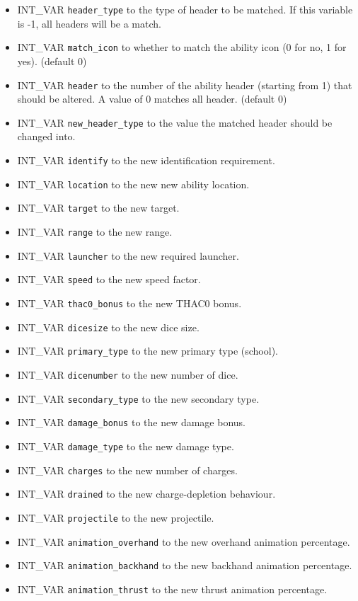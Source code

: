 \documentclass{article}
\begin{document}
\begin{itemize}
\item INT_VAR \verb+header_type+ to the type of header to be matched. If this variable is -1, all headers will be a match.
\item INT_VAR \verb+match_icon+ to whether to match the ability icon (0 for no, 1 for yes). (default 0)
\item INT_VAR \verb+header+ to the number of the ability header (starting from 1) that should be altered. A value of 0 matches all header. (default 0)
\item INT_VAR \verb+new_header_type+ to the value the matched header should be changed into.
\item INT_VAR \verb+identify+ to the new identification requirement.
\item INT_VAR \verb+location+ to the new new ability location.
\item INT_VAR \verb+target+ to the new target.
\item INT_VAR \verb+range+ to the new range.
\item INT_VAR \verb+launcher+ to the new required launcher.
\item INT_VAR \verb+speed+ to the new speed factor.
\item INT_VAR \verb+thac0_bonus+ to the new THAC0 bonus.
\item INT_VAR \verb+dicesize+ to the new dice size.
\item INT_VAR \verb+primary_type+ to the new primary type (school).
\item INT_VAR \verb+dicenumber+ to the new number of dice.
\item INT_VAR \verb+secondary_type+ to the new secondary type.
\item INT_VAR \verb+damage_bonus+ to the new damage bonus.
\item INT_VAR \verb+damage_type+ to the new damage type.
\item INT_VAR \verb+charges+ to the new number of charges.
\item INT_VAR \verb+drained+ to the new charge-depletion behaviour.
\item INT_VAR \verb+projectile+ to the new projectile.
\item INT_VAR \verb+animation_overhand+ to the new overhand animation percentage.
\item INT_VAR \verb+animation_backhand+ to the new backhand animation percentage.
\item INT_VAR \verb+animation_thrust+ to the new thrust animation percentage.

\end{itemize}
\end{document}

